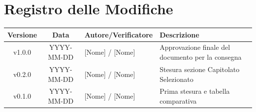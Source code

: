 \section*{Registro delle Modifiche}
\begin{table}[ht]
	\centering
	\renewcommand{\arraystretch}{1.5}
	\begin{tabularx}{\textwidth}{c c l X}
		\toprule
		\textbf{Versione} & \textbf{Data} & \textbf{Autore/Verificatore} & \textbf{Descrizione} \\
		\midrule
		v1.0.0 & YYYY-MM-DD & {[Nome] / [Nome]} & Approvazione finale del documento per la consegna \\
		v0.2.0 & YYYY-MM-DD & {[Nome] / [Nome]} & Stesura sezione Capitolato Selezionato \\
		v0.1.0 & YYYY-MM-DD & {[Nome] / [Nome]} & Prima stesura e tabella comparativa \\
		\bottomrule
	\end{tabularx}
\end{table}